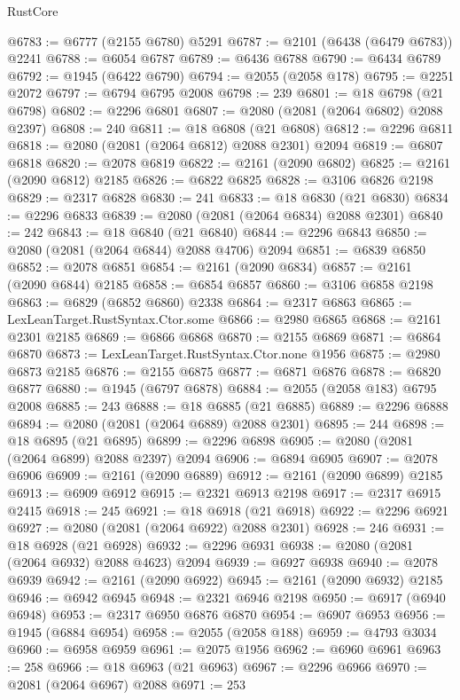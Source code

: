 \begin{lexlean}{RustCore}
\begin{coremodule}
@6783 := @6777 (@2155 @6780) @5291
@6787 := @2101 (@6438 (@6479 @6783)) @2241
@6788 := @6054 @6787
@6789 := @6436 @6788
@6790 := @6434 @6789
@6792 := @1945 (@6422 @6790)
@6794 := @2055 (@2058 @178)
@6795 := @2251 @2072
@6797 := @6794 @6795 @2008
@6798 := 239
@6801 := @18 @6798 (@21 @6798)
@6802 := @2296 @6801
@6807 := @2080 (@2081 (@2064 @6802) @2088 @2397)
@6808 := 240
@6811 := @18 @6808 (@21 @6808)
@6812 := @2296 @6811
@6818 := @2080 (@2081 (@2064 @6812) @2088 @2301) @2094
@6819 := @6807 @6818
@6820 := @2078 @6819
@6822 := @2161 (@2090 @6802)
@6825 := @2161 (@2090 @6812) @2185
@6826 := @6822 @6825
@6828 := @3106 @6826 @2198
@6829 := @2317 @6828
@6830 := 241
@6833 := @18 @6830 (@21 @6830)
@6834 := @2296 @6833
@6839 := @2080 (@2081 (@2064 @6834) @2088 @2301)
@6840 := 242
@6843 := @18 @6840 (@21 @6840)
@6844 := @2296 @6843
@6850 := @2080 (@2081 (@2064 @6844) @2088 @4706) @2094
@6851 := @6839 @6850
@6852 := @2078 @6851
@6854 := @2161 (@2090 @6834)
@6857 := @2161 (@2090 @6844) @2185
@6858 := @6854 @6857
@6860 := @3106 @6858 @2198
@6863 := @6829 (@6852 @6860) @2338
@6864 := @2317 @6863
@6865 := LexLeanTarget.RustSyntax.Ctor.some
@6866 := @2980 @6865
@6868 := @2161 @2301 @2185
@6869 := @6866 @6868
@6870 := @2155 @6869
@6871 := @6864 @6870
@6873 := LexLeanTarget.RustSyntax.Ctor.none @1956
@6875 := @2980 @6873 @2185
@6876 := @2155 @6875
@6877 := @6871 @6876
@6878 := @6820 @6877
@6880 := @1945 (@6797 @6878)
@6884 := @2055 (@2058 @183) @6795 @2008
@6885 := 243
@6888 := @18 @6885 (@21 @6885)
@6889 := @2296 @6888
@6894 := @2080 (@2081 (@2064 @6889) @2088 @2301)
@6895 := 244
@6898 := @18 @6895 (@21 @6895)
@6899 := @2296 @6898
@6905 := @2080 (@2081 (@2064 @6899) @2088 @2397) @2094
@6906 := @6894 @6905
@6907 := @2078 @6906
@6909 := @2161 (@2090 @6889)
@6912 := @2161 (@2090 @6899) @2185
@6913 := @6909 @6912
@6915 := @2321 @6913 @2198
@6917 := @2317 @6915 @2415
@6918 := 245
@6921 := @18 @6918 (@21 @6918)
@6922 := @2296 @6921
@6927 := @2080 (@2081 (@2064 @6922) @2088 @2301)
@6928 := 246
@6931 := @18 @6928 (@21 @6928)
@6932 := @2296 @6931
@6938 := @2080 (@2081 (@2064 @6932) @2088 @4623) @2094
@6939 := @6927 @6938
@6940 := @2078 @6939
@6942 := @2161 (@2090 @6922)
@6945 := @2161 (@2090 @6932) @2185
@6946 := @6942 @6945
@6948 := @2321 @6946 @2198
@6950 := @6917 (@6940 @6948)
@6953 := @2317 @6950 @6876 @6870
@6954 := @6907 @6953
@6956 := @1945 (@6884 @6954)
@6958 := @2055 (@2058 @188)
@6959 := @4793 @3034
@6960 := @6958 @6959
@6961 := @2075 @1956
@6962 := @6960 @6961
@6963 := 258
@6966 := @18 @6963 (@21 @6963)
@6967 := @2296 @6966
@6970 := @2081 (@2064 @6967) @2088
@6971 := 253

\end{coremodule}
\end{lexlean}
